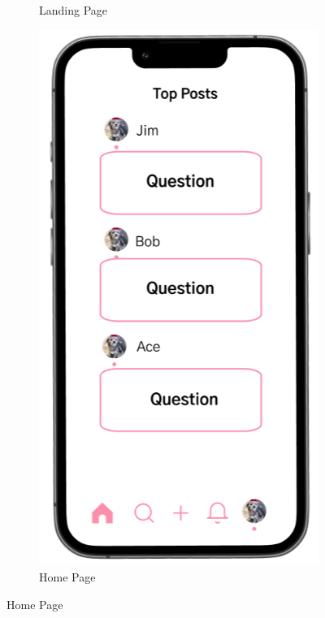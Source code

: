 \begin{figure}[h]
\begin{subfigure}[b]{0.3\textwidth}
    \caption{Landing Page}
    \label{fig:landing}
  \end{subfigure}
  \hfill
  \begin{subfigure}[b]{0.3\textwidth}
    \includegraphics[width=\textwidth]{Figures/home.png}
    \caption{Home Page}
    \label{fig:home}
  \end{subfigure}

\end{figure}
